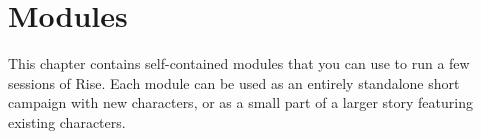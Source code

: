 \chapter{Modules}

\setcounter{secnumdepth}{3}

This chapter contains self-contained modules that you can use to run a few sessions of Rise.
Each module can be used as an entirely standalone short campaign with new characters, or as a small part of a larger story featuring existing characters.



